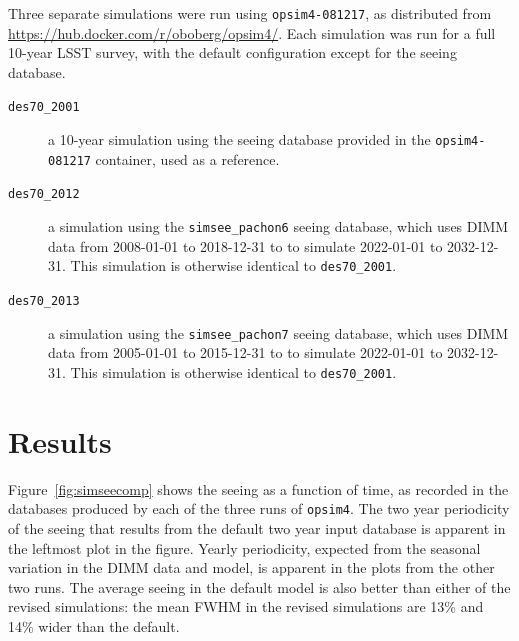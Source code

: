 \documentclass[\docopts]{\docclass}
\begin{document}
Three separate simulations were run using \texttt{opsim4-081217}, as
distributed from \url{https://hub.docker.com/r/oboberg/opsim4/}. Each
simulation was run for a full 10-year LSST survey, with the default
configuration except for the seeing database.

\begin{description}
  \item[\texttt{des70\_2001}] a 10-year simulation using the seeing database
    provided in the \texttt{opsim4-081217} container, used as a reference.
  \item[\texttt{des70\_2012}] a simulation using the
    \texttt{simsee\_pachon6} seeing database, which uses DIMM data
    from 2008-01-01 to 2018-12-31 to to simulate 2022-01-01 to
    2032-12-31. This simulation is otherwise identical to
    \texttt{des70\_2001}.
  \item[\texttt{des70\_2013}] a simulation using the
    \texttt{simsee\_pachon7} seeing database, which uses DIMM data
    from 2005-01-01 to 2015-12-31 to to simulate 2022-01-01 to
    2032-12-31. This simulation is otherwise identical to
    \texttt{des70\_2001}.
\end{description}


\section{Results}
\label{sec:results}

Figure~\ref{fig:simseecomp} shows the seeing as a function of time, as
recorded in the databases produced by each of the three runs of
\texttt{opsim4}. The two year periodicity of the seeing that results
from the default two year input database is apparent in the leftmost
plot in the figure. Yearly periodicity, expected from the seasonal
variation in the DIMM data and model, is apparent in the plots from
the other two runs. The average seeing in the default model is also
better than either of the revised simulations: the mean FWHM in the
revised simulations are 13\% and 14\% wider than the default.
\end{document}
